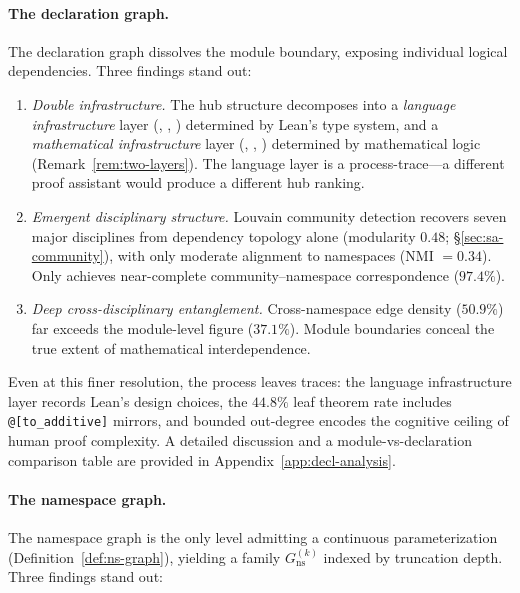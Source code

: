 \paragraph{The declaration graph.}
\label{sec:thm-conclusion}
The declaration graph dissolves the module boundary, exposing individual logical dependencies. Three findings stand out:

\begin{enumerate}
    \item \textit{Double infrastructure.} The hub structure decomposes into a \emph{language infrastructure} layer (, , ) determined by Lean's type system, and a \emph{mathematical infrastructure} layer (, , ) determined by mathematical logic (Remark~\ref{rem:two-layers}). The language layer is a process-trace---a different proof assistant would produce a different hub ranking.

    \item \textit{Emergent disciplinary structure.} Louvain community detection recovers seven major disciplines from dependency topology alone (modularity $0.48$; \S\ref{sec:sa-community}), with only moderate alignment to namespaces (NMI $= 0.34$). Only  achieves near-complete community--namespace correspondence ($97.4\%$).

    \item \textit{Deep cross-disciplinary entanglement.} Cross-namespace edge density ($50.9\%$) far exceeds the module-level figure ($37.1\%$). Module boundaries conceal the true extent of mathematical interdependence.
\end{enumerate}

\noindent
Even at this finer resolution, the process leaves traces: the language infrastructure layer records Lean's design choices, the $44.8\%$ leaf theorem rate includes \texttt{@[to\_additive]} mirrors, and bounded out-degree encodes the cognitive ceiling of human proof complexity. A detailed discussion and a module-vs-declaration comparison table are provided in Appendix~\ref{app:decl-analysis}.

\paragraph{The namespace graph.}
\label{sec:ns-analysis}
The namespace graph is the only level admitting a continuous parameterization (Definition~\ref{def:ns-graph}), yielding a family $G_{\mathrm{ns}}^{(k)}$ indexed by truncation depth. Three findings stand out:

